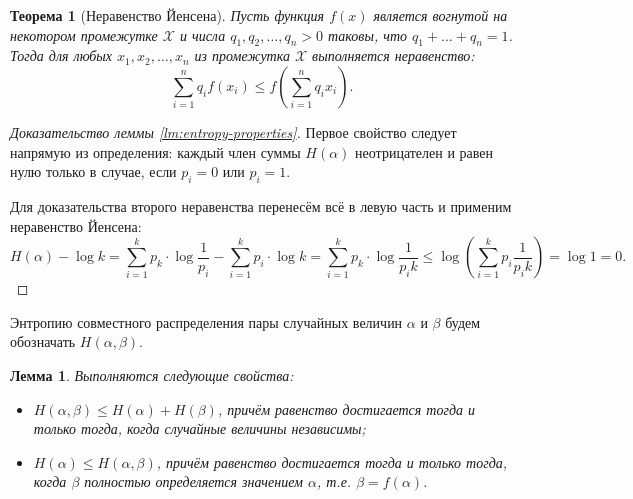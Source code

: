 \documentclass[12pt]{article}
\newcommand{\seqn}[2]{{#1}_1,{#1}_2,\dotsc,{#1}_{#2}}
\theoremstyle{definition}
\theoremstyle{plain}
\newtheorem{theorem}{Теорема}[section]
\newtheorem{lemma}{Лемма}[section]
\theoremstyle{remark}
\begin{document}
\begin{theorem}[Неравенство Йенсена]
Пусть функция \(f ( x ) \) является вогнутой на некотором промежутке \(\mathcal {X}\)
и числа \(\seqn{q}{n}>0\) таковы, что \(q_1+\ldots +q_{n}=1\). 
Тогда для любых \(\seqn{x}{n}\) из промежутка \(\mathcal X\) выполняется неравенство:
\[
\sum _{{i=1}}^{{n}}q_{i}f(x_{i})\leq f\left(\sum _{{i=1}}^{{n}}q_{i}x_{i}\right). 
\]
\end{theorem}
\begin{proof}[Доказательство леммы \ref{lm:entropy-properties}]
Первое свойство следует напрямую из определения: каждый член суммы \(H(\alpha)\) неотрицателен и равен нулю только в случае, если \(p_i = 0\) или \(p_i = 1\).

Для доказательства второго неравенства перенесём всё в левую часть и применим неравенство Йенсена:
\[
H(\alpha) - \log k 
= \sum_{i=1}^k p_k\cdot\log\frac{1}{p_i} - \sum_{i=1}^k p_i\cdot\log k 
= \sum_{i=1}^k p_k\cdot\log\frac{1}{p_ik} 
\le \log\left(\sum_{i=1}^k p_i\frac{1}{p_i k}\right) = \log 1 = 0.
\]
\end{proof}
Энтропию совместного распределения пары случайных величин \(\alpha\) и \(\beta\) будем обозначать \(H(\alpha,\beta)\).
\begin{lemma}
Выполняются следующие свойства:
\begin{itemize}
    \item \(H(\alpha, \beta) \le H(\alpha) + H(\beta)\), причём равенство достигается тогда и только тогда, когда случайные величины независимы;
    \item \(H(\alpha) \le H(\alpha, \beta)\), причём равенство достигается тогда и только тогда, когда \(\beta\) полностью определяется значением \(\alpha\), 
    т.е. \(\beta = f(\alpha)\).
\end{itemize}
\end{lemma}
\end{document}
